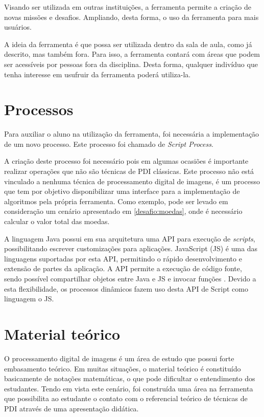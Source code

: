 \documentclass[
	12pt,				%
	oneside,			%
	a4paper,			%
	english,			%
	french,				%
	spanish,			%
	brazil,				%
	]{abntex2}
\begin{document}
Visando ser utilizada em outras instituições, a ferramenta permite a criação de novas missões e desafios. Ampliando, desta forma, o uso da ferramenta para mais usuários.

A ideia da ferramenta é que possa ser utilizada dentro da sala de aula, como já descrito, mas também fora. Para isso, a ferramenta contará com áreas que podem ser acessíveis por pessoas fora da disciplina. Desta forma, qualquer indivíduo que tenha interesse em usufruir da ferramenta poderá utiliza-la.

\section{Processos}
\label{sec:processos}

Para auxiliar o aluno na utilização da ferramenta, foi necessária a implementação de um novo processo. Este processo foi chamado de \textit{Script Process}.

A criação deste processo foi necessário pois em algumas ocasiões é importante realizar operações que não são técnicas de PDI clássicas. Este processo não está vinculado a nenhuma técnica de processamento digital de imagens, é um processo que tem por objetivo disponibilizar uma interface para a implementação de algoritmos pela própria ferramenta. Como exemplo, pode ser levado em consideração um cenário apresentado em \ref{desafio:moedas}, onde é necessário calcular o valor total das moedas.

A linguagem Java possui em sua arquitetura uma API para execução de \textit{scripts}, possibilitando escrever customizações para aplicações. JavaScript (JS) é uma das linguagens suportadas por esta API, permitindo o rápido desenvolvimento e extensão de partes da aplicação. A API permite a execução de código fonte, sendo possível compartilhar objetos entre Java e JS e invocar funções \cite{oracle}. Devido a esta flexibilidade, os processos dinâmicos fazem uso desta API de Script como linguagem o JS. 

\section{Material teórico}

O processamento digital de imagens é um área de estudo que possui forte embasamento teórico. Em muitas situações, o material teórico é constituído basicamente de notações matemáticas, o que pode dificultar o entendimento dos estudantes. Tendo em vista este cenário, foi construída uma área na ferramenta que possibilita ao estudante o contato com o referencial teórico de técnicas de PDI através de uma apresentação didática.
\end{document}
